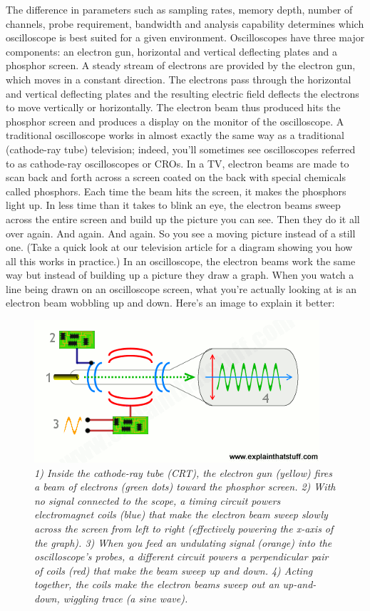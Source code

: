 \documentclass[letterpaper]{article}
\begin{document}
The difference in parameters such as sampling rates, memory depth, number of channels, probe requirement, bandwidth and analysis capability determines which oscilloscope is best suited for a given environment. Oscilloscopes have three major components: an electron gun, horizontal and vertical deflecting plates and a phosphor screen. A steady stream of electrons are provided by the electron gun, which moves in a constant direction. The electrons pass through the horizontal and vertical deflecting plates and the resulting electric field deflects the electrons to move vertically or horizontally. The electron beam thus produced hits the phosphor screen and produces a display on the monitor of the oscilloscope. A traditional oscilloscope works in almost exactly the same way as a traditional (cathode-ray tube) television; indeed, you'll sometimes see oscilloscopes referred to as cathode-ray oscilloscopes or CROs. In a TV, electron beams are made to scan back and forth across a screen coated on the back with special chemicals called phosphors. Each time the beam hits the screen, it makes the phosphors light up. In less time than it takes to blink an eye, the electron beams sweep across the entire screen and build up the picture you can see. Then they do it all over again. And again. And again. So you see a moving picture instead of a still one. (Take a quick look at our television article for a diagram showing you how all this works in practice.) In an oscilloscope, the electron beams work the same way but instead of building up a picture they draw a graph. When you watch a line being drawn on an oscilloscope screen, what you're actually looking at is an electron beam wobbling up and down.
Here’s an image to explain it better:     
\begin{figure}[H]
    \centering
    \includegraphics[width=.7\linewidth]{img/intro/how-works}
    \caption{\textit{
1) Inside the cathode-ray tube (CRT), the electron gun (yellow) fires a beam of electrons (green dots) toward the phosphor screen. 2) With no signal connected to the scope, a timing circuit powers electromagnet coils (blue) that make the electron beam sweep slowly across the screen from left to right (effectively powering the x-axis of the graph). 3) When you feed an undulating signal (orange) into the oscilloscope's probes, a different circuit powers a perpendicular pair of coils (red) that make the beam sweep up and down. 4) Acting together, the coils make the electron beams sweep out an up-and-down, wiggling trace (a sine wave).
}}
\end{figure}
\end{document}
